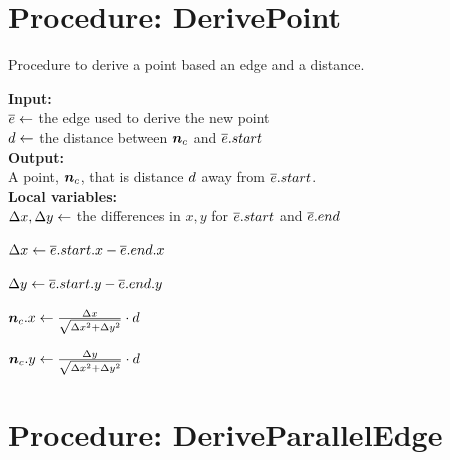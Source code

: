 \clearpage

\section{Procedure: DerivePoint}


    \begin{algorithm}[tbh!]
        \caption{Procedure to derive a point based an edge and a distance.}\label{alg:derive corridor point}
        \textbf{Input:} \\
        $ \protect\overline{e} \gets $ the edge used to derive the new point \\
        $ d \gets $ the distance between $ \PointP $ and $ \protect\overline{e}.start $ \\

        \textbf{Output:} \\
        A point, $ \PointP $, that is distance $ d $ away from $ \protect\overline{e}.start $. \\
    
        \textbf{Local variables:} \\
        $ \Delta x, \Delta y \gets $ the differences in $ x, y $ for $ \protect\overline{e}.start $ and $ \protect\overline{e}.end $ \\
    
        \begin{algorithmic}[1]
                \State $ \Delta x \gets \protect\overline{e}.start.x - \protect\overline{e}.end.x $
    
                \State $ \Delta y \gets \protect\overline{e}.start.y - \protect\overline{e}.end.y $
    
                \State $ \bm{n}_c.x \gets \frac{\Delta x}{\sqrt{\Delta x^2 + \Delta y^2}} \cdot d $
    
                \State $ \bm{n}_c.y \gets \frac{\Delta y}{\sqrt{\Delta x^2 + \Delta y^2}} \cdot d $
    
            \State \Return{$ \PointP $}
    
            \EndProcedure
    
        \end{algorithmic}
    \end{algorithm}
    

\section{Procedure: DeriveParallelEdge}

